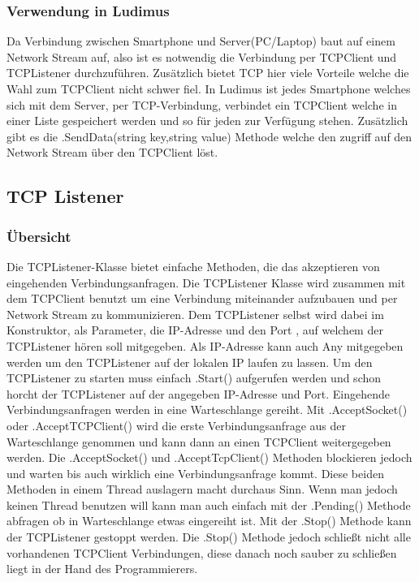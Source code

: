 \subsubsection{Verwendung in Ludimus}
Da Verbindung zwischen Smartphone und Server(PC/Laptop) baut auf einem Network Stream auf, also ist es notwendig die Verbindung per TCPClient und TCPListener durchzuführen. Zusätzlich bietet TCP hier viele Vorteile welche die Wahl zum TCPClient nicht schwer fiel. In Ludimus ist jedes Smartphone welches sich mit dem Server, per TCP-Verbindung, verbindet ein TCPClient welche in einer Liste gespeichert werden und so für jeden zur Verfügung stehen. Zusätzlich gibt es die .SendData(string key,string value) Methode welche den zugriff auf den Network Stream über den TCPClient löst. 
\subsection{TCP Listener}
\subsubsection{Übersicht}
Die TCPListener-Klasse bietet einfache Methoden, die das akzeptieren von eingehenden Verbindungsanfragen. Die TCPListener Klasse wird zusammen mit dem TCPClient benutzt um eine Verbindung miteinander aufzubauen und per Network Stream zu kommunizieren. Dem TCPListener selbst wird dabei im Konstruktor, als Parameter, die IP-Adresse und den Port , auf welchem der TCPListener hören soll mitgegeben. Als IP-Adresse kann auch Any mitgegeben werden um den TCPListener auf der lokalen IP laufen zu lassen. Um den TCPListener zu starten muss einfach .Start() aufgerufen werden und schon horcht der TCPListener auf der angegeben IP-Adresse und Port. Eingehende Verbindungsanfragen werden in eine Warteschlange gereiht. Mit .AcceptSocket() oder .AcceptTCPClient() wird die erste Verbindungsanfrage aus der Warteschlange genommen und kann dann an einen TCPClient weitergegeben werden. Die .AcceptSocket() und .AcceptTcpClient() Methoden blockieren jedoch und warten bis auch wirklich eine Verbindungsanfrage kommt. Diese beiden Methoden in einem Thread auslagern macht durchaus Sinn. Wenn man jedoch keinen Thread benutzen will kann man auch einfach mit der .Pending() Methode abfragen ob in Warteschlange etwas eingereiht ist. Mit der .Stop() Methode kann der TCPListener gestoppt werden. Die .Stop() Methode jedoch schließt nicht alle vorhandenen TCPClient Verbindungen, diese danach noch sauber zu schließen liegt in der Hand des Programmierers.
